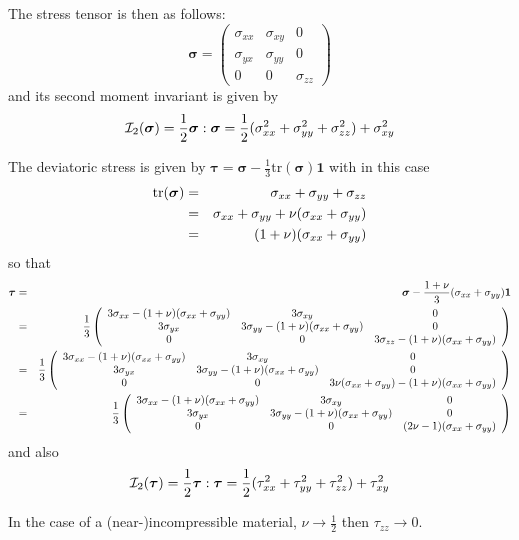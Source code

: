 The stress tensor is then as follows:
\[
{\bm \sigma}
=
\left(
\begin{array}{ccc}
\sigma_{xx}  & \sigma_{xy} & 0 \\
\sigma_{yx} & \sigma_{yy}  & 0 \\
0 & 0 & \sigma_{zz}
\end{array}
\right)
\]
and its second moment invariant is given by
\[
{\cal I}_2(\bm\sigma)
={\frac12 {\bm\sigma}:{\bm\sigma}}
={\frac12(\sigma_{xx}^2+\sigma_{yy}^2+\sigma_{zz}^2) +\sigma_{xy}^2
}
\]



The deviatoric stress is given by ${\bm \tau} 
= {\bm\sigma} -\frac13 \textrm{tr}(\bm\sigma){\bm 1}$ with
in this case
\begin{eqnarray}
\textrm{tr}(\bm\sigma) 
&=& \sigma_{xx}+\sigma_{yy}+\sigma_{zz} \nonumber\\
&=& \sigma_{xx}+\sigma_{yy}+\nu(\sigma_{xx}+\sigma_{yy})\nonumber\\
&=& (1+\nu) (\sigma_{xx}+\sigma_{yy})
\end{eqnarray}
so that
\begin{eqnarray}
{\bm \tau}
&=& {\bm\sigma} -\frac{1+\nu}{3} (\sigma_{xx}+\sigma_{yy})  {\bm 1} \nonumber\\
&=&
\frac13
\left(
\begin{array}{ccc}
3\sigma_{xx} - (1+\nu)(\sigma_{xx}+\sigma_{yy}) & 3\sigma_{xy} & 0 \\
3\sigma_{yx} & 3\sigma_{yy} - (1+\nu)(\sigma_{xx}+\sigma_{yy}) & 0 \\
0 & 0 & 3\sigma_{zz}- (1+\nu)(\sigma_{xx}+\sigma_{yy})
\end{array}
\right) \nonumber\\
&=&
\frac13
\left(
\begin{array}{ccc}
3\sigma_{xx} - (1+\nu)(\sigma_{xx}+\sigma_{yy}) & 3\sigma_{xy} & 0 \\
3\sigma_{yx} & 3\sigma_{yy} - (1+\nu)(\sigma_{xx}+\sigma_{yy}) & 0 \\
0 & 0 & 3\nu(\sigma_{xx}+\sigma_{yy})- (1+\nu)(\sigma_{xx}+\sigma_{yy})
\end{array}
\right) \nonumber\\
&=&
\frac13
\left(
\begin{array}{ccc}
3\sigma_{xx} - (1+\nu)(\sigma_{xx}+\sigma_{yy}) & 3\sigma_{xy} & 0 \\
3\sigma_{yx} & 3\sigma_{yy} - (1+\nu)(\sigma_{xx}+\sigma_{yy}) & 0 \\
0 & 0 & (2\nu-1)(\sigma_{xx}+\sigma_{yy})
\end{array}
\right) 
\end{eqnarray}
and also
\[
{\cal I}_2(\bm\tau)
={\frac12 {\bm\tau}:{\bm\tau}}
={\frac12(\tau_{xx}^2+\tau_{yy}^2+\tau_{zz}^2) +\tau_{xy}^2
}
\]
\begin{remark}
In the case of a (near-)incompressible material, $\nu\rightarrow \frac12$ then $\tau_{zz} \rightarrow 0$.
\end{remark}


